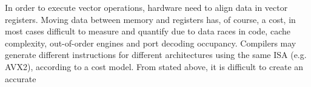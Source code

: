In order to execute vector operations, hardware need to align data in vector 
registers. Moving data between memory and registers has, of course, a cost, 
in most cases difficult to measure and quantify due to data races in code, 
cache complexity, out-of-order engines and port decoding occupancy. Compilers 
may generate different instructions for different architectures using the same 
ISA (e.g. AVX2), according to a cost model. From stated above, it is difficult 
to create an accurate 